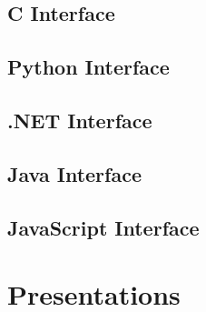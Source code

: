 \documentclass{book}
\begin{document}
\clearpage\pagestyle{empty}

\begin{cpdflib}
\clearpage
\section*{C Interface}
\begin{small}\tt

\end{small}
\end{cpdflib}

\begin{pycpdflib}
\clearpage
\section*{Python Interface}
\begin{small}\tt

\end{small}
\end{pycpdflib}

\begin{dotnetcpdflib}
\clearpage
\section*{.NET Interface}
\begin{small}\tt

\end{small}
\end{dotnetcpdflib}

\begin{jcpdflib}
\clearpage
\section*{Java Interface}
\begin{small}\tt

\end{small}
\end{jcpdflib}

\begin{jscpdflib}
\clearpage
\section*{JavaScript Interface}
\begin{small}\tt

\end{small}
\end{jscpdflib}

\chapter{Presentations}\label{chap:7}\pagestyle{fancy}
\end{document}
